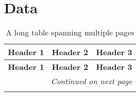 \chapter{Data}

\vspace{0pt}

\begin{longtable}{|c|c|c|}
    \caption{A long table spanning multiple pages} \\
    \hline
    \textbf{Header 1} & \textbf{Header 2} & \textbf{Header 3} \\
    \hline
    \endfirsthead

    \hline
    \textbf{Header 1} & \textbf{Header 2} & \textbf{Header 3} \\
    \hline
    \endhead

    \hline
    \multicolumn{3}{r}{\textit{Continued on next page}} \\
    \hline
    \endfoot

    \hline
    \endlastfoot


\end{longtable}
